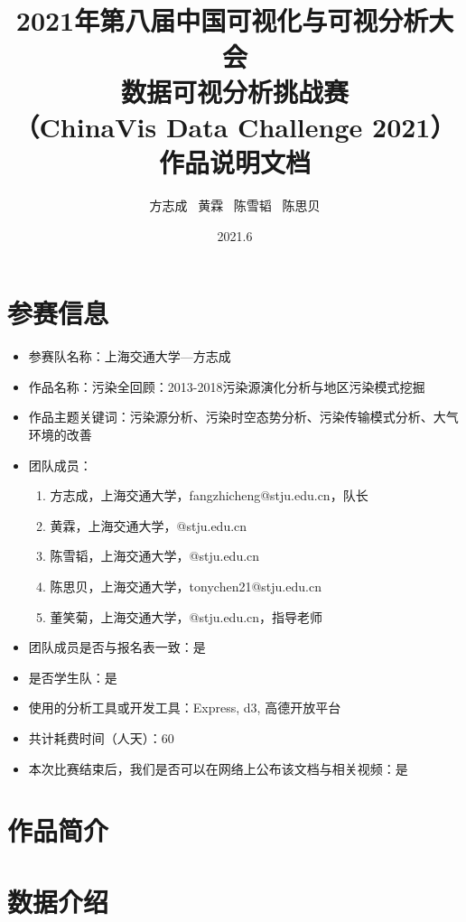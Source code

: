\documentclass[UTF8]{ctexrep}
\title{
    \horrule{0.5pt} \\[0.4cm]
    \huge 2021年第八届中国可视化与可视分析大会\\
    数据可视分析挑战赛\\
    （ChinaVis Data Challenge 2021）\\
    作品说明文档\\
    \horrule{2pt}
}
\author{
    方志成 \ 黄霖 \ 陈雪韬 \ 陈思贝
}
\date{
    2021.6
}
\begin{document}
    \maketitle

    \section{参赛信息}

    \begin{itemize}
        \item 参赛队名称：上海交通大学—方志成
        \item 作品名称：污染全回顾：2013-2018污染源演化分析与地区污染模式挖掘
        \item 作品主题关键词：污染源分析、污染时空态势分析、污染传输模式分析、大气环境的改善
        \item 团队成员：
        \begin{enumerate}
            \item 方志成，上海交通大学，fangzhicheng@stju.edu.cn，队长
            \item 黄霖，上海交通大学，@stju.edu.cn
            \item 陈雪韬，上海交通大学，@stju.edu.cn
            \item 陈思贝，上海交通大学，tonychen21@stju.edu.cn
            \item 董笑菊，上海交通大学，@stju.edu.cn，指导老师
        \end{enumerate}
        \item 团队成员是否与报名表一致：是
        \item 是否学生队：是
        \item 使用的分析工具或开发工具：Express, d3, 高德开放平台
        \item 共计耗费时间（人天）：60
        \item 本次比赛结束后，我们是否可以在网络上公布该文档与相关视频：是
    \end{itemize}

    \section{作品简介}

    \section{数据介绍}
\end{document}
